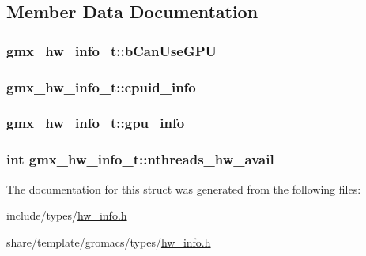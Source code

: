 \subsection{\-Member \-Data \-Documentation}
\hypertarget{structgmx__hw__info__t_aa037b3ef1b023a7e22811a61d4326b83}{
\subsubsection[{b\-Can\-Use\-G\-P\-U}]{ {\bf gmx\-\_\-hw\-\_\-info\-\_\-t\-::b\-Can\-Use\-G\-P\-U}}}\label{structgmx__hw__info__t_aa037b3ef1b023a7e22811a61d4326b83}
\hypertarget{structgmx__hw__info__t_a3ff0b176a3bf6816a3e2d8ae529cc300}{
\subsubsection[{cpuid\-\_\-info}]{ {\bf gmx\-\_\-hw\-\_\-info\-\_\-t\-::cpuid\-\_\-info}}}\label{structgmx__hw__info__t_a3ff0b176a3bf6816a3e2d8ae529cc300}
\hypertarget{structgmx__hw__info__t_afa4f79128ef06ef3c52ff037d1658bff}{
\subsubsection[{gpu\-\_\-info}]{ {\bf gmx\-\_\-hw\-\_\-info\-\_\-t\-::gpu\-\_\-info}}}\label{structgmx__hw__info__t_afa4f79128ef06ef3c52ff037d1658bff}
\hypertarget{structgmx__hw__info__t_a29c14e5202581a74837ba4f19c6de866}{
\subsubsection[{nthreads\-\_\-hw\-\_\-avail}]{\setlength{\rightskip}{0pt plus 5cm}int {\bf gmx\-\_\-hw\-\_\-info\-\_\-t\-::nthreads\-\_\-hw\-\_\-avail}}}\label{structgmx__hw__info__t_a29c14e5202581a74837ba4f19c6de866}


\-The documentation for this struct was generated from the following files\-:\begin{DoxyCompactItemize}
\item 
include/types/\hyperlink{include_2types_2hw__info_8h}{hw\-\_\-info.\-h}\item 
share/template/gromacs/types/\hyperlink{share_2template_2gromacs_2types_2hw__info_8h}{hw\-\_\-info.\-h}\end{DoxyCompactItemize}
